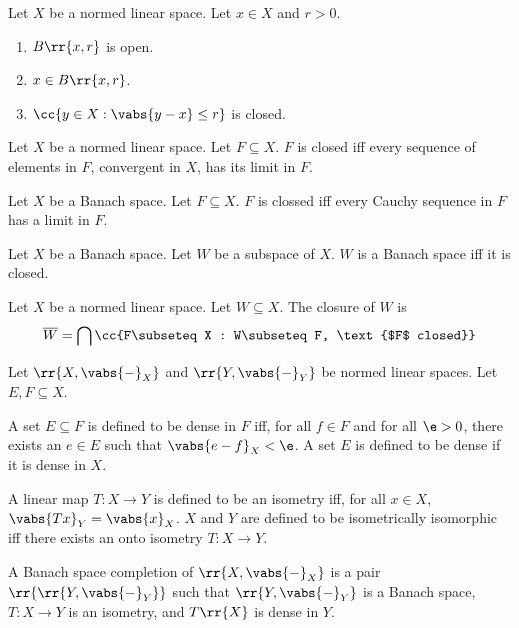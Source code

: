 \documentclass{article}
\begin{document}
\begin{theorem}
	Let $X$ be a normed linear space. Let $x\in X$ and $r>0$.
	\begin{enumerate}
		\item $B\rr{x,r}$ is open.
		\item $x\in B\rr{x,r}$.
		\item $\cc{y\in X : \vabs{y-x}\leq r}$ is closed.
	\end{enumerate}
\end{theorem}

\begin{theorem}
	Let $X$ be a normed linear space. Let $F\subseteq X$. $F$ is closed iff every sequence of
	elements in $F$, convergent in $X$, has its limit in $F$.
\end{theorem}

\begin{theorem}
	Let $X$ be a Banach space. Let $F\subseteq X$. $F$ is clossed iff every Cauchy sequence in
	$F$ has a limit in $F$.
\end{theorem}

\begin{theorem}
	Let $X$ be a Banach space. Let $W$ be a subspace of $X$. $W$ is a Banach space iff it is
	closed.
\end{theorem}

\begin{definition}
	\label{def:closure}
	Let $X$ be a normed linear space. Let $W\subseteq X$. The closure of $W$ is
	\begin{align*}
		\overline W = \bigcap \cc{F\subseteq X : W\subseteq F, \text{$F$ closed}}
	\end{align*}
\end{definition}

\begin{definition}
	Let $\rr{X, \vabs{-}_{X}}$ and $\rr{Y, \vabs{-}_{Y}}$ be normed linear spaces. Let $E,F\subseteq X$.

	A set $E\subseteq F$ is defined to be dense in $F$ iff, for all $f\in F$ and for all
	$\e > 0$, there exists an $e\in E$ such that $\vabs{e-f}_{X}<\e$. A set $E$ is defined
	to be dense if it is dense in $X$.

	A linear map $T:X\to Y$ is defined to be an isometry iff, for all $x\in X$,
	$\vabs{Tx}_{Y}=\vabs{x}_{X}$. $X$ and $Y$ are defined to be isometrically isomorphic iff
	there exists an onto isometry $T:X\to Y$.

	A Banach space completion of $\rr{X,\vabs{-}_{X}}$ is a pair $\rr{\rr{Y,\vabs{-}_{Y}}}$
	such that $\rr{Y,\vabs{-}_{Y}}$ is a Banach space, $T:X\to Y$ is an isometry, and $T\rr{X}$
	is dense in $Y$.
\end{definition}
\end{document}
